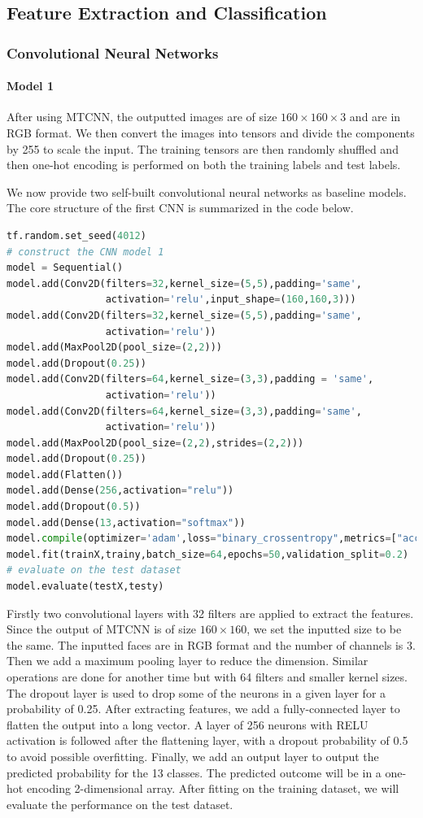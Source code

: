 \subsection{Feature Extraction and Classification}

\subsubsection{Convolutional Neural Networks}
\paragraph{Model 1}
After using MTCNN, the outputted images are of size $160 \times 160 \times 3$ and are in RGB format. We then convert the images into tensors and divide the components by 255 to scale the input. The training tensors are then randomly shuffled and then one-hot encoding is performed on both the training labels and test labels.

We now provide two self-built convolutional neural networks as baseline models. The core structure of the first CNN is summarized in the code below.
\begin{lstlisting}[language=python]
tf.random.set_seed(4012)
# construct the CNN model 1
model = Sequential()
model.add(Conv2D(filters=32,kernel_size=(5,5),padding='same', 
                 activation='relu',input_shape=(160,160,3)))
model.add(Conv2D(filters=32,kernel_size=(5,5),padding='same', 
                 activation='relu'))
model.add(MaxPool2D(pool_size=(2,2)))
model.add(Dropout(0.25))
model.add(Conv2D(filters=64,kernel_size=(3,3),padding = 'same', 
                 activation='relu'))
model.add(Conv2D(filters=64,kernel_size=(3,3),padding='same', 
                 activation='relu'))
model.add(MaxPool2D(pool_size=(2,2),strides=(2,2)))
model.add(Dropout(0.25))
model.add(Flatten())
model.add(Dense(256,activation="relu"))
model.add(Dropout(0.5))
model.add(Dense(13,activation="softmax"))
model.compile(optimizer='adam',loss="binary_crossentropy",metrics=["accuracy"])
model.fit(trainX,trainy,batch_size=64,epochs=50,validation_split=0.2)
# evaluate on the test dataset
model.evaluate(testX,testy)
\end{lstlisting}
\vspace{-0.6cm}
Firstly two convolutional layers with 32 filters are applied to extract the features. Since the output of MTCNN is of size $160\times 160$, we set the inputted size to be the same. The inputted faces are in RGB format and the number of channels is 3. Then we add a maximum pooling layer to reduce the dimension. Similar operations are done for another time but with 64 filters and smaller kernel sizes. The dropout layer is used to drop some of the neurons in a given layer for a probability of 0.25. After extracting features, we add a fully-connected layer to flatten the output into a long vector. A layer of 256 neurons with RELU activation is followed after the flattening layer, with a dropout probability of 0.5 to avoid possible overfitting. Finally, we add an output layer to output the predicted probability for the 13 classes. The predicted outcome will be in a one-hot encoding 2-dimensional array. After fitting on the training dataset, we will evaluate the performance on the test dataset. 

